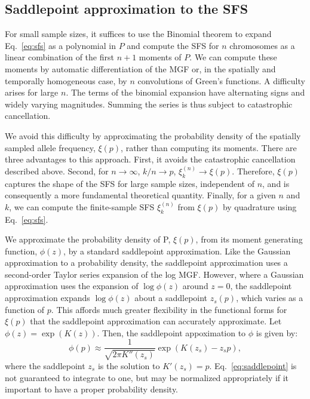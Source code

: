 \documentclass{article}
\begin{document}
\subsection*{Saddlepoint approximation to the SFS}

For small sample sizes, it suffices to use the Binomial theorem to expand Eq.~\ref{eq:sfs} as a polynomial in $P$ and compute the SFS for $n$ chromosomes as a linear combination of the first $n+1$ moments of $P$.
We can compute these moments by automatic differentiation of the MGF or, in the spatially and temporally homogeneous case, by $n$ convolutions of Green's functions.
A difficulty arises for large $n$.
The terms of the binomial expansion have alternating signs and widely varying magnitudes.
Summing the series is thus subject to catastrophic cancellation.

We avoid this difficulty by approximating the probability density of the spatially sampled allele frequency, $\xi(p)$, rather than computing its moments.
There are three advantages to this approach.
First, it avoids the catastrophic cancellation described above.
Second, for $n \to \infty$, $k/n \to p$, $\xi^{(n)}_k \to \xi(p)$.
Therefore, $\xi(p)$ captures the shape of the SFS for large sample sizes, independent of $n$, and is consequently a more fundamental theoretical quantity.
Finally, for a given $n$ and $k$, we can compute the finite-sample SFS $\xi^{(n)}_k$ from $\xi(p)$ by quadrature using Eq.~\ref{eq:sfs}.

We approximate the probability density of P, $\xi(p)$, from its moment generating function, $\phi(z)$, by a standard saddlepoint approximation.
Like the Gaussian approximation to a probability density, the saddlepoint approximation uses a second-order Taylor series expansion of the log MGF.
However, where a Gaussian approximation uses the expansion of $\log \phi(z)$ around $z=0$, the saddlepoint approximation expands $\log \phi(z)$ about a saddlepoint $z_s(p)$, which varies as a function of $p$.
This affords much greater flexibility in the functional forms for $\xi(p)$ that the saddlepoint approximation can accurately approximate.
Let $\phi(z) = \exp(K(z))$.
Then, the saddlepoint appoximation to $\phi$ is given by:
\begin{equation}
    \phi(p) \approx \frac{1}{\sqrt{2\pi K''(z_s)}} \exp \left(K(z_s) - z_s p\right),
    \label{eq:saddlepoint}
\end{equation}
where the saddlepoint $z_s$ is the solution to $K'(z_s) = p$.
Eq.~\ref{eq:saddlepoint} is not guaranteed to integrate to one, but may be normalized appropriately if it important to have a proper probability density.
\end{document}

